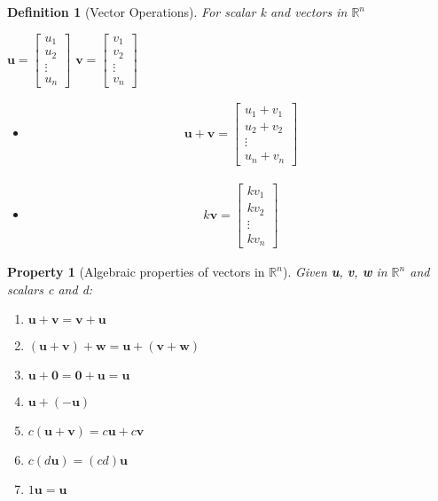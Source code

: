 \documentclass[12pt]{report}
\newtheorem{dfn}{Definition}
\newtheorem{prop}{Property}
\begin{document}
\begin{dfn}[Vector Operations]
For scalar k and vectors in $\mathbb{R}^n$

\begin{center}
$\mathbf{u}=\begin{bmatrix}u_1 \\ u_2 \\ \vdots \\ u_n\end{bmatrix}$
$\mathbf{v}=\begin{bmatrix}v_1 \\ v_2 \\ \vdots \\ v_n\end{bmatrix}$
\end{center}

\begin{itemize}
\item[vector addition] \begin{align} \mathbf{u}+\mathbf{v}=\begin{bmatrix}u_1+v_1 \\ u_2+v_2 \\ \vdots \\ u_n+v_n\end{bmatrix}
\end{align}
\item[scalar multiplication]
\begin{align}
k \mathbf{v}=\begin{bmatrix}k v_1 \\ k v_2 \\ \vdots \\ k v_n\end{bmatrix}
\end{align}
\end{itemize}
\end{dfn}

\begin{prop}[Algebraic properties of vectors in $\mathbb{R}^n$]
Given \textbf{u}, \textbf{v}, \textbf{w} in $\mathbb{R}^n$ and scalars c and d:

\begin{enumerate}
\item $\bm{u}+\bm{v}=\bm{v}+\bm{u}$
\item $(\bm{u}+\bm{v})+\bm{w}=\bm{u}+(\bm{v}+\bm{w})$
\item $\bm{u}+\bm{0}=\bm{0}+\bm{u}=\bm{u}$
\item $\bm{u}+(-\bm{u})$
\item $c(\bm{u}+\bm{v})=c\bm{u}+c\bm{v}$
\item $c(d\bm{u})=(cd)\bm{u}$
\item $1\bm{u}=\bm{u}$
\end{enumerate}
\end{prop}
\end{document}
